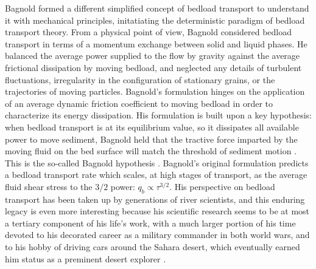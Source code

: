 \documentclass{article}
\begin{document}
Bagnold formed a different simplified concept of bedload transport to understand it with mechanical principles, initatiating the deterministic paradigm of bedload transport theory. 
From a physical point of view, Bagnold considered bedload transport in terms of a momentum exchange between solid and liquid phases.
He balanced the average power supplied to the flow by gravity against the average frictional dissipation by moving bedload, and neglected any details of turbulent fluctuations, irregularity in the configuration of stationary grains, or the trajectories of moving particles.
Bagnold's formulation hinges on the application of an average dynamic friction coefficient to moving bedload in order to characterize its energy dissipation. 
His formulation is built upon a key hypothesis: when bedload transport is at its equilibrium value, so it dissipates all available power to move sediment, Bagnold held that the tractive force imparted by the moving fluid on the bed surface will match the threshold of sediment motion \citep{Bagnold1973}. 
This is the so-called Bagnold hypothesis \citep{Engelund1976, Luque1976, Seminara2002, Ancey2006}.
Bagnold's original formulation predicts a bedload transport rate which scales, at high stages of transport, as the average fluid shear stress to the $3/2$ power: $q_b \propto \tau^{3/2}.$ 
His perspective on bedload transport has been taken up by generations of river scientists, and this enduring legacy is even more interesting because his scientific research seems to be at most a tertiary component of his life's work, with a much larger portion of his time devoted to his decorated career as a military commander in both world wars, and to his hobby of driving cars around the Sahara desert, which eventually earned him status as a preminent desert explorer \citep{Bagnold1988}. 
\end{document}
